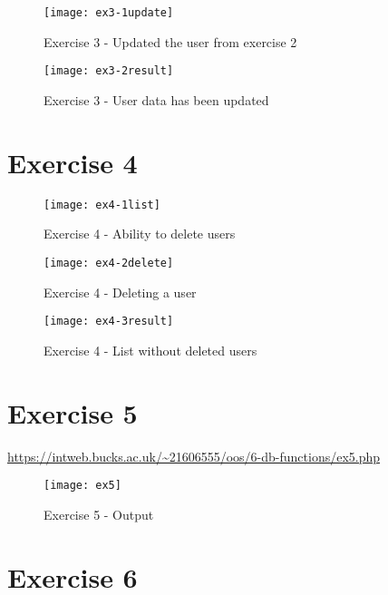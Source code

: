 \begin{figure}[H]
  \caption{Exercise 3 - Updated the user from exercise 2}
  \centering
  \texttt{[image: ex3-1update]}
\end{figure}

\begin{figure}[H]
  \caption{Exercise 3 - User data has been updated}
  \centering
  \texttt{[image: ex3-2result]}
\end{figure}

\clearpage
\section{Exercise 4}

\captionsetup{type=figure}


\begin{figure}[H]
  \caption{Exercise 4 - Ability to delete users}
  \centering
  \texttt{[image: ex4-1list]}
\end{figure}

\begin{figure}[H]
  \caption{Exercise 4 - Deleting a user}
  \centering
  \texttt{[image: ex4-2delete]}
\end{figure}

\begin{figure}[H]
  \caption{Exercise 4 - List without deleted users}
  \centering
  \texttt{[image: ex4-3result]}
\end{figure}

\clearpage
\section{Exercise 5}

\url{https://intweb.bucks.ac.uk/~21606555/oos/6-db-functions/ex5.php}

\captionsetup{type=figure}


\captionsetup{type=figure}


\begin{figure}[H]
  \caption{Exercise 5 - Output}
  \centering
  \texttt{[image: ex5]}
\end{figure}

\clearpage
\section{Exercise 6}

